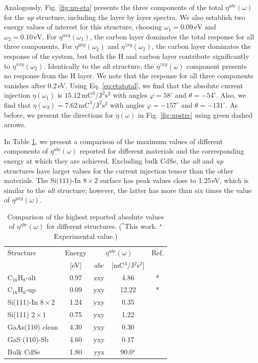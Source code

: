 \documentclass[pss]{wiley2sp} %
\begin{document}
Analogously, Fig. \ref{fig:up-eta} presents the three components of the total
$\eta^{abc}(\omega)$ for the \emph{up} structure, including the layer by layer
spectra. We also establish two energy values of interest for this structure,
choosing $\omega_{1} = 0.09\,\mathrm{eV}$ and $\omega_{2} = 0.10\,\mathrm{eV}$. For
$\eta^{axy}(\omega_{1})$, the carbon layer dominates the total response for all three
components. For $\eta^{yxy}(\omega_{2})$ and $\eta^{zxy}(\omega_{2})$, the carbon layer
dominates the response of the system, but both the H and carbon layer contribute
significantly to $\eta^{xxy}(\omega_{2})$. Identically to the \emph{alt} structure,
the $\eta^{zxy}(\omega)$ component presents no response from the H layer.  We
note that the response for all three components vanishes after 0.2\,eV. Using
Eq. \eqref{eq:etatotal}, we find that the absolute current injection $\eta(\omega_{1})$
is $15.12\,\mathrm{mC}^{3}/\mathrm{J}^{2}\mathrm{s}^{2}$ with angles
$\varphi=58^{\circ}$ and $\theta=-54^{\circ}$. Also, we find that
$\eta(\omega_{2})=7.62\,\mathrm{mC}^{3}/\mathrm{J}^{2}\mathrm{s}^{2}$ with angles
$\varphi=-157^{\circ}$ and $\theta=-131^{\circ}$. As before, we present the
directions for $\eta(\omega)$ in Fig. \ref{fig:upstrc} using green dashed
arrows.

In Table \ref{tab:etacomp}, we present a comparison of the maximum values of
different components of $\eta^{abc}(\omega)$ reported for different materials
and the corresponding energy at which they are achieved. Excluding bulk CdSe,
the \emph{alt} and \emph{up} structures have larger values for the current
injection tensor than the other materials. The Si(111)-In $8\times 2$ surface
has peak values close to 1.25\,eV, which is similar to the \emph{alt} structure;
however, the latter has more than six times the value of $\eta^{yxy}(\omega)$.

\begin{table}%
\centering
\sidecaption
\begin{tabular}{lcccc}
\hline
\hline
Structure & Energy &  \multicolumn{2}{c}{$\eta^{abc}(\omega)$} &  Ref.\\
\cline{3-4}
          & [eV]   & $abc$ & [mC$^{3}$/J$^{2}$s$^{2}$] \\
\hline
C$_{16}$H$_{8}$-alt     & 0.97  & zxy & 4.86  & *     \\
C$_{16}$H$_{8}$-up      & 0.09  & yxy & 12.22 & *     \\
Si(111)-In $8\times2$   & 1.24  & yxy & 0.35  & \cite{arzatePRB14}  \\
Si(111) $2\times1$      & 0.75  & yxy & 1.22  & \cite{cabellosPRB11} \\
GaAs(110) clean         & 4.30  & yxy & 0.30  & \cite{cabellosPRB11}     \\
GaS (110)-Sb            & 4.60  & yxy & 0.17  & \cite{cabellosPRB11}\\
Bulk CdSe               & 1.80  & yyz & 90.0$^{\star}$  & \cite{lamanAPL99}\\
\hline
\hline
\end{tabular}
\caption[]{%
Comparison of the highest reported absolute values of {$\eta^{abc}(\omega)$}
for different structures. ($^{*}$This work. $^{\star}$Experimental value.)}
\label{tab:etacomp}
\end{table}
\end{document}
